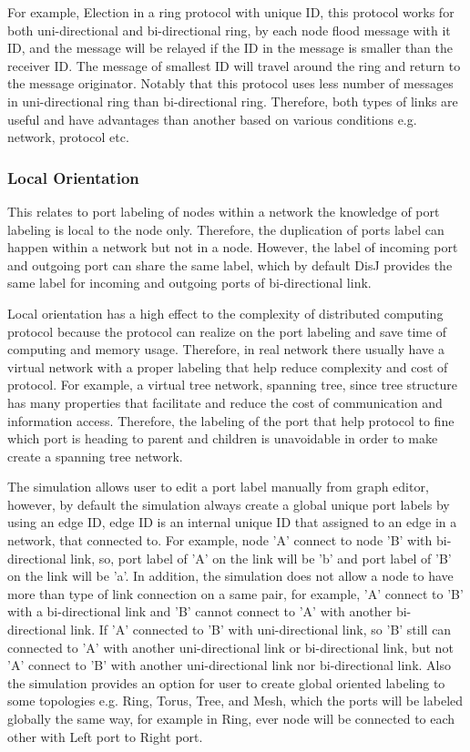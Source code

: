 For example, Election in a ring protocol with unique ID, this protocol works for both uni-directional and bi-directional ring, by each node flood message with it ID, and the message will be relayed if the ID in the message is smaller than the receiver ID. The message of smallest ID will travel around the ring and return to the message originator. Notably that this protocol uses less number of messages in uni-directional ring than bi-directional ring. Therefore, both types of links are useful and have advantages than another based on various conditions e.g. network, protocol etc.


\subsubsection*{Local Orientation}
This relates to port labeling of nodes within a network the knowledge of port labeling is local to the node only. Therefore, the duplication of ports label can happen within a network but not in a node. However, the label of incoming port and outgoing port can share the same label, which by default DisJ provides the same label for incoming and outgoing ports of bi-directional link.

Local orientation has a high effect to the complexity of distributed computing protocol because the protocol can realize on the port labeling and save time of computing and memory usage. Therefore, in real network there usually have a virtual network with a proper labeling that help reduce complexity and cost of protocol. For example, a virtual tree network, spanning tree, since tree structure has many properties that facilitate and reduce the cost of communication and information access. Therefore, the labeling of the port that help protocol to fine which port is heading to parent and children is unavoidable in order to make create a spanning tree network.

The simulation allows user to edit a port label manually from graph editor, however, by default the simulation always create a global unique port labels by using an edge ID, edge ID is an internal unique ID that assigned to an edge in a network, that connected to. For example, node 'A' connect to node 'B' with bi-directional link, so, port label of 'A' on the link will be 'b' and port label of 'B' on the link will be 'a'. In addition, the simulation does not allow a node to have more than type of link connection on a same pair, for example, 'A' connect to 'B' with a bi-directional link and 'B' cannot connect to 'A' with another bi-directional link. If 'A' connected to 'B' with uni-directional link, so 'B' still can connected to 'A' with another uni-directional link or bi-directional link, but not 'A' connect to 'B' with another uni-directional link nor bi-directional link. Also the simulation provides an option for user to create global oriented labeling to some topologies e.g. Ring, Torus, Tree, and Mesh, which the ports will be labeled globally the same way, for example in Ring, ever node will be connected to each other with Left port to Right port.

